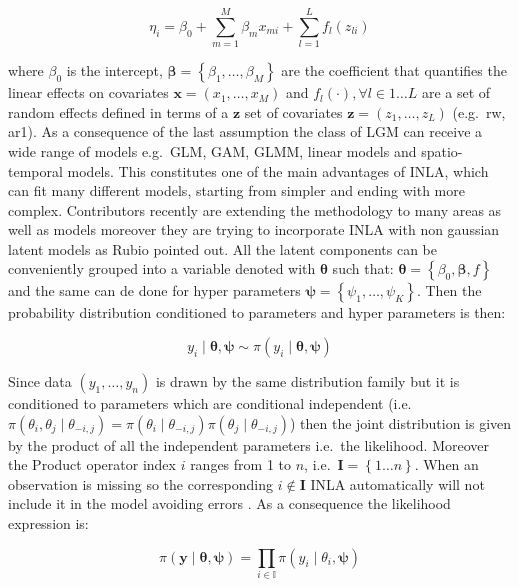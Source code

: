 \documentclass[
  12pt,
  a4paper,
  oneside]{book}
\begin{document}
\[
\eta_{i}=\beta_{0}+\sum_{m=1}^{M} \beta_{m} x_{m i}+\sum_{l=1}^{L} f_{l}\left(z_{l i}\right)
\]

where \(\beta_{0}\) is the intercept, \(\boldsymbol{\beta}=\left\{\beta_{1}, \ldots, \beta_{M}\right\}\) are the coefficient that quantifies the linear effects on covariates \(\boldsymbol{x}=\left({x}_{1}, \ldots, {x}_{M}\right)\) and \(f_{l}(\cdot), \forall l \in 1 \ldots L\) are a set of random effects defined in terms of a \(\boldsymbol{z}\) set of covariates \(\boldsymbol{z}=\left(z_{1}, \ldots, z_{L}\right)\) (e.g.~rw, ar1). As a consequence of the last assumption the class of LGM can receive a wide range of models e.g.~GLM, GAM, GLMM, linear models and spatio-temporal models. This constitutes one of the main advantages of INLA, which can fit many different models, starting from simpler and ending with more complex. Contributors recently are extending the methodology to many areas as well as models moreover they are trying to incorporate INLA with non gaussian latent models as Rubio \citeyearpar{Bayesian_INLA_Rubio} pointed out.
All the latent components can be conveniently grouped into a variable denoted with \(\boldsymbol{\theta}\) such that: \(\boldsymbol{\theta}=\left\{\beta_{0}, \boldsymbol{\beta}, f\right\}\) and the same can de done for hyper parameters \(\boldsymbol{\psi} = \left\{\psi_{1}, \ldots, \psi_{K}\right\}\).
Then the probability distribution conditioned to parameters and hyper parameters is then:

\[
y_{i} \mid \boldsymbol{\theta}, \boldsymbol{\psi} \sim \pi\left(y_{i} \mid \boldsymbol{\theta},\boldsymbol{\psi}\right)
\]

Since data \(\left(y_{1}, \ldots, y_{n}\right)\) is drawn by the same distribution family but it is conditioned to parameters which are conditional independent (i.e.~\(\pi\left(\theta_{i}, \theta_{j} \mid \theta_{-i, j}\right)=\pi\left(\theta_{i} \mid \theta_{-i, j}\right) \pi\left(\theta_{j} \mid \theta_{-i, j}\right)\)) \citep{GMRFRue} then the joint distribution is given by the product of all the independent parameters i.e.~the likelihood. Moreover the Product operator index \(i\) ranges from 1 to \(n\), i.e.~\(\mathbf{I} = \left\{1 \ldots n \right\}\). When an observation is missing so the corresponding \(i \notin \mathbf{I}\) INLA automatically will not include it in the model avoiding errors \citeyearpar{Bayesian_INLA_Rubio}. As a consequence the likelihood expression is:

\begin{equation}
\pi(\boldsymbol{y} \mid \boldsymbol{\theta}, \boldsymbol{\psi})=\prod_{i \in \mathbb{I}} \pi\left(y_{i} \mid \theta_{i}, \boldsymbol{\psi}\right)
\label{eq:likelihood}
\end{equation}
\end{document}
